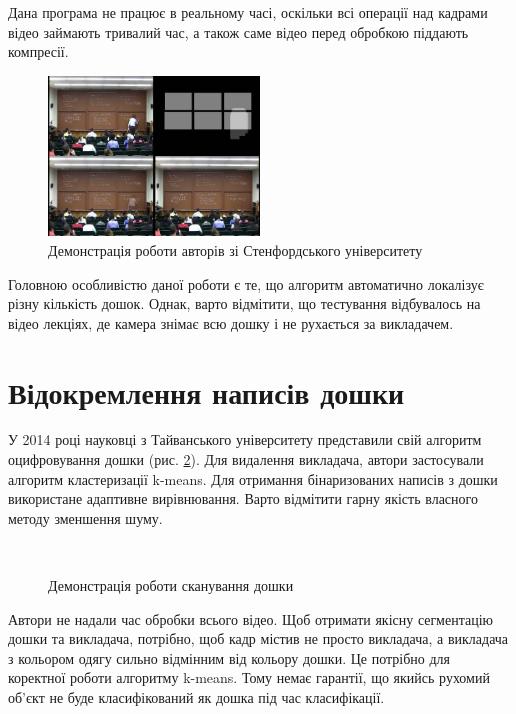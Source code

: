 Дана програма не працює в реальному часі, оскільки всі операції над кадрами
відео займають тривалий час, а також саме відео перед обробкою
піддають компресії.
\begin{figure}[H]
  \centering
  \includegraphics[width=0.5\textwidth]{images/suh}
  \caption{Демонстрація роботи авторів зі Стенфордського університету \cite{suh}
    \label{fig:suh}
  }
\end{figure}
Головною особливістю даної роботи є те, що  алгоритм автоматично локалізує
різну кількість дошок. Однак, варто відмітити, що тестування відбувалось на
відео лекціях, де камера знімає всю дошку і не рухається за викладачем.

\section{Відокремлення написів дошки}
У 2014 році науковці з Тайванського університету представили свій алгоритм \cite{yeh}
оцифровування дошки (рис. \ref{fig:yeh}). Для видалення викладача, автори застосували
алгоритм кластеризації k-means. Для отримання бінаризованих написів з дошки
використане адаптивне вирівнювання. Варто відмітити гарну
якість власного методу зменшення шуму.
\begin{figure}[H]
  \centering
  \\
  \caption{Демонстрація роботи сканування дошки \cite{yeh}
    \label{fig:yeh}
  }
\end{figure}
Автори не надали час обробки всього відео. Щоб отримати якісну сегментацію
дошки та викладача, потрібно, щоб кадр містив не просто викладача, а викладача з кольором одягу 
сильно відмінним від кольору дошки. Це потрібно для коректної роботи алгоритму k-means.
Тому немає гарантії, що якийсь рухомий об'єкт не буде класифікований як дошка під час класифікації.

